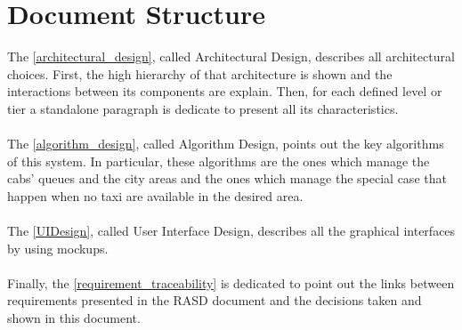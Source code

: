 \documentclass[\mainpath/main]{subfiles}
\begin{document}
\section{Document Structure}
The \autoref{architectural_design}, called Architectural Design, describes all architectural choices. First, the high hierarchy of that architecture is shown and the interactions between its components are explain. Then, for each defined level or tier a standalone paragraph is dedicate to present all its characteristics.\\
\\
The \autoref{algorithm_design}, called Algorithm Design, points out the key algorithms of this system. In particular, these algorithms are the ones which manage the cabs' queues and the city areas and the ones which manage the special case that happen when no taxi are available in the desired area.\\
\\
The \autoref{UIDesign}, called User Interface Design, describes all the graphical interfaces by using \glspl{mockup}.\\
\\
Finally, the \autoref{requirement_traceability} is dedicated to point out the links between requirements presented in the RASD document and the decisions taken and shown in this document.
\end{document}
